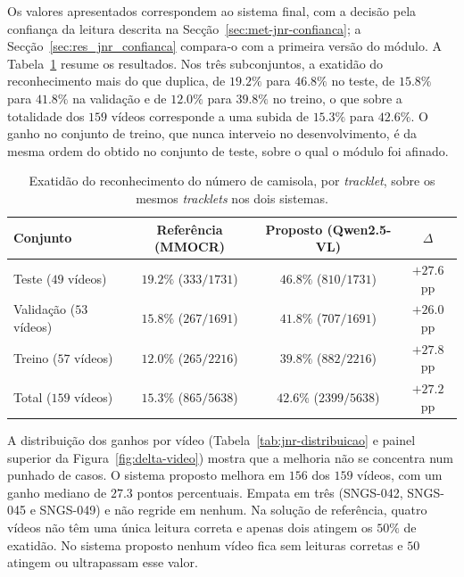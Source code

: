 Os valores apresentados correspondem ao sistema final, com a decisão pela confiança da leitura descrita na Secção~\ref{sec:met-jnr-confianca}; a Secção~\ref{sec:res_jnr_confianca} compara-o com a primeira versão do módulo. A Tabela~\ref{tab:jnr} resume os resultados. Nos três subconjuntos, a exatidão do reconhecimento mais do que duplica, de $19.2\%$ para $46.8\%$ no teste, de $15.8\%$ para $41.8\%$ na validação e de $12.0\%$ para $39.8\%$ no treino, o que sobre a totalidade dos $159$ vídeos corresponde a uma subida de $15.3\%$ para $42.6\%$. O ganho no conjunto de treino, que nunca interveio no desenvolvimento, é da mesma ordem do obtido no conjunto de teste, sobre o qual o módulo foi afinado.

\begin{table}[htbp]
    \centering
    \caption{Exatidão do reconhecimento do número de camisola, por \emph{tracklet}, sobre os mesmos \emph{tracklets} nos dois sistemas.}
    \label{tab:jnr}
    \begin{tabular}{|l|c|c|c|}
        \hline
        \textbf{Conjunto} & \textbf{Referência (MMOCR)} & \textbf{Proposto (Qwen2.5-VL)} & \textbf{$\Delta$} \\
        \hline
        Teste ($49$ vídeos)     & $19.2\%$ ($333/1731$)   & $46.8\%$ ($810/1731$)   & $+27.6$ pp \\
        \hline
        Validação ($53$ vídeos) & $15.8\%$ ($267/1691$) & $41.8\%$ ($707/1691$) & $+26.0$ pp \\
        \hline
        Treino ($57$ vídeos)    & $12.0\%$ ($265/2216$) & $39.8\%$ ($882/2216$) & $+27.8$ pp \\
        \hline
        Total ($159$ vídeos)    & $15.3\%$ ($865/5638$)     & $42.6\%$ ($2399/5638$)     & $+27.2$ pp \\
        \hline
    \end{tabular}
\end{table}

A distribuição dos ganhos por vídeo (Tabela~\ref{tab:jnr-distribuicao} e painel superior da Figura~\ref{fig:delta-video}) mostra que a melhoria não se concentra num punhado de casos. O sistema proposto melhora em $156$ dos $159$ vídeos, com um ganho mediano de $27.3$ pontos percentuais. Empata em três (SNGS-042, SNGS-045 e SNGS-049) e não regride em nenhum. Na solução de referência, quatro vídeos não têm uma única leitura correta e apenas dois atingem os $50\%$ de exatidão. No sistema proposto nenhum vídeo fica sem leituras corretas e $50$ atingem ou ultrapassam esse valor.

